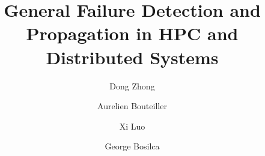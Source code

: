 \documentclass[5p,times,twocolumn]{elsarticle}
\begin{document}
%

\title{General Failure Detection and Propagation in HPC and Distributed Systems}

%

\author[First]{Dong Zhong}%

\author[First]{Aurelien Bouteiller}

\author[First]{Xi Luo}

\author[First]{George Bosilca}

\end{document}
